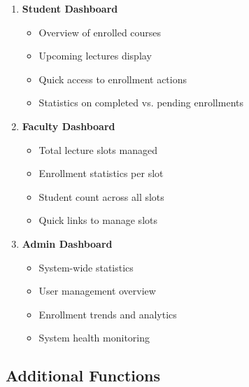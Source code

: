 \begin{enumerate}[leftmargin=*]
    \item \textbf{Student Dashboard}
    \begin{itemize}
        \item Overview of enrolled courses
        \item Upcoming lectures display
        \item Quick access to enrollment actions
        \item Statistics on completed vs. pending enrollments
    \end{itemize}
    
    \item \textbf{Faculty Dashboard}
    \begin{itemize}
        \item Total lecture slots managed
        \item Enrollment statistics per slot
        \item Student count across all slots
        \item Quick links to manage slots
    \end{itemize}
    
    \item \textbf{Admin Dashboard}
    \begin{itemize}
        \item System-wide statistics
        \item User management overview
        \item Enrollment trends and analytics
        \item System health monitoring
    \end{itemize}
\end{enumerate}

\subsection{Additional Functions}

